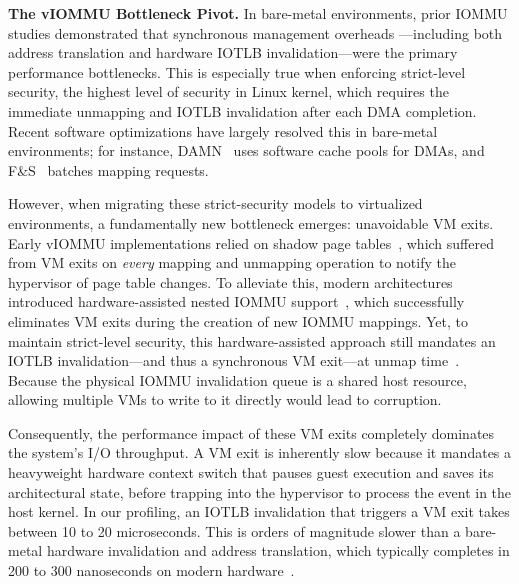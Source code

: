 \textbf{The vIOMMU Bottleneck Pivot.}
In bare-metal environments, prior IOMMU studies demonstrated
that synchronous management overheads
---including both address translation and hardware IOTLB invalidation---were the primary performance bottlenecks.
This is especially true when enforcing strict-level security, the highest level of security in Linux kernel,
    which requires the immediate unmapping and IOTLB invalidation after each DMA completion.
Recent software optimizations have largely resolved this in bare-metal environments;
for instance, DAMN~\cite{markuze2018damn} uses software cache pools for DMAs,
and F\&S~\cite{Rubin2024FastSafe} batches mapping requests.

However, when migrating these strict-security models to virtualized environments,
a fundamentally new bottleneck emerges: unavoidable VM exits.
Early vIOMMU implementations relied on shadow page tables~\cite{qemu_vtd,Amit2011vIOMMU},
which suffered from VM exits on \emph{every} mapping and unmapping operation
to notify the hypervisor of page table changes.
To alleviate this, modern architectures introduced hardware-assisted nested IOMMU support~\cite{intel_vtd_spec},
which successfully eliminates VM exits during the creation of new IOMMU mappings.
Yet, to maintain strict-level security,
this hardware-assisted approach still mandates an IOTLB invalidation---and thus a synchronous VM exit---at unmap time~\cite{qemu_10_0, intel_vtd_spec_caching}.
Because the physical IOMMU invalidation queue is a shared host resource,
allowing multiple VMs to write to it directly would lead to corruption.

Consequently, the performance impact of these VM exits
completely dominates the system's I/O throughput.
A VM exit is inherently slow because it mandates a heavyweight hardware context switch
that pauses guest execution and saves its architectural state,
before trapping into the hypervisor to process the event in the host kernel.
In our profiling, an IOTLB invalidation that triggers a VM exit
takes between 10 to 20 microseconds.
This is orders of magnitude slower than a bare-metal hardware invalidation and address translation,
    which typically completes in 200 to 300 nanoseconds on modern hardware~\cite{Rubin2024FastSafe}.


